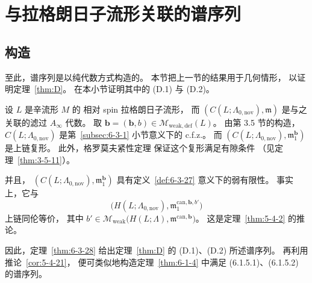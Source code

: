 
\section{与拉格朗日子流形关联的谱序列}
\label{sec:6-4}

\subsection{构造}
\label{subsec:6-4-1}

至此，谱序列是以纯代数方式构造的。
本节把上一节的结果用于几何情形，
以证明定理~\ref{thm:D}。
在本小节证明其中的 (D.1) 与 (D.2)。

设 $L$ 是辛流形 $M$ 的
相对 spin 拉格朗日子流形，
而 $(C(L;\Lambda_{0,\mathrm{nov}}),\mathfrak m)$
是与之关联的滤过 $A_\infty$ 代数。
取
$\mathbf b=(\boldsymbol b,b)
\in\mathcal M_{\mathrm{weak,def}}(L)$。
由第 3.5 节的构造，
$C(L;\Lambda_{0,\mathrm{nov}})$
是第~\ref{subsec:6-3-1} 小节意义下的 c.f.z.。
而
$(C(L;\Lambda_{0,\mathrm{nov}}),
\mathfrak m_1^{\mathbf b})$
是上链复形。
此外，格罗莫夫紧性定理
保证这个复形满足有隙条件
（见定理~\ref{thm:3-5-11}）。

并且，
$(C(L;\Lambda_{0,\mathrm{nov}}),
\mathfrak m_1^{\mathbf b})$
具有定义~\ref{def:6-3-27} 意义下的弱有限性。
事实上，它与
\[
\bigl(H(L;\Lambda_{0,\mathrm{nov}}),
\mathfrak m_1^{\mathrm{can},\boldsymbol b,b'}\bigr)
\]
上链同伦等价，
其中
$b'\in\mathcal M_{\mathrm{weak}}
\bigl(H(L;\Lambda),
\mathfrak m^{\mathrm{can},\boldsymbol b}\bigr)$。
这是定理~\ref{thm:5-4-2} 的推论。

因此，定理~\ref{thm:6-3-28}
给出定理~\ref{thm:D} 的
(D.1)、(D.2) 所述谱序列。
再利用推论~\ref{cor:5-4-21}，
便可类似地构造定理~\ref{thm:6-1-4}
中满足 (6.1.5.1)、(6.1.5.2) 的谱序列。
